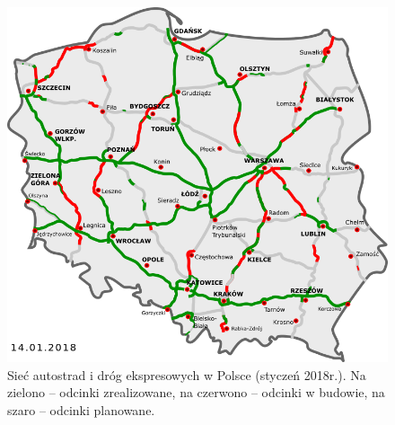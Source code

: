 \begin{figure}[h]
\caption{Sieć autostrad i dróg ekspresowych w Polsce (styczeń 2018r.). Na zielono -- odcinki zrealizowane, na czerwono -- odcinki w budowie, na szaro -- odcinki planowane.}
\includegraphics[width=\textwidth]{images/2018.png}
\end{figure}

